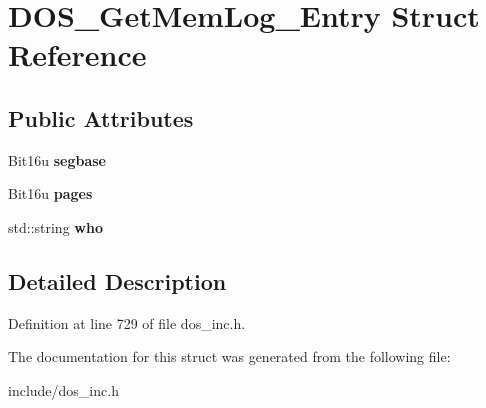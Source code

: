 \hypertarget{structDOS__GetMemLog__Entry}{\section{D\-O\-S\-\_\-\-Get\-Mem\-Log\-\_\-\-Entry Struct Reference}
\label{structDOS__GetMemLog__Entry}
}
\subsection*{Public Attributes}
\begin{DoxyCompactItemize}
\item 
\hypertarget{structDOS__GetMemLog__Entry_ae0b40132debcc642571b174128f14a0c}{Bit16u {\bfseries segbase}}\label{structDOS__GetMemLog__Entry_ae0b40132debcc642571b174128f14a0c}

\item 
\hypertarget{structDOS__GetMemLog__Entry_a1687425bea21c2dba1d7dcf5137ac5e3}{Bit16u {\bfseries pages}}\label{structDOS__GetMemLog__Entry_a1687425bea21c2dba1d7dcf5137ac5e3}

\item 
\hypertarget{structDOS__GetMemLog__Entry_ad8a1936e9a6a49aa924a0fc9e585d18f}{std\-::string {\bfseries who}}\label{structDOS__GetMemLog__Entry_ad8a1936e9a6a49aa924a0fc9e585d18f}

\end{DoxyCompactItemize}


\subsection{Detailed Description}


Definition at line 729 of file dos\-\_\-inc.\-h.



The documentation for this struct was generated from the following file\-:\begin{DoxyCompactItemize}
\item 
include/dos\-\_\-inc.\-h\end{DoxyCompactItemize}
